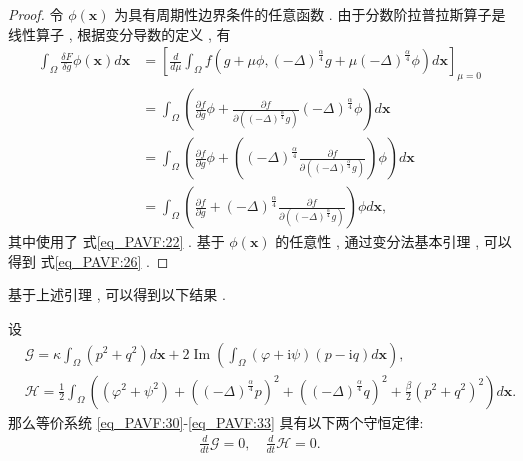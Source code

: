 \begin{proof}
	令 $\phi(\boldsymbol{x})$ 为具有周期性边界条件的任意函数 . 由于分数阶拉普拉斯算子是线性算子 , 根据变分导数的定义 , 有
\begin{equation}
\begin{aligned}
\int_{\Omega} \frac{\delta F}{\delta g} \phi(\boldsymbol{x}) d \boldsymbol{x} &=\left[\frac{d}{d \mu} \int_{\Omega} f\left(g+\mu \phi , (-\Delta)^{\frac{\alpha}{4}} g+\mu(-\Delta)^{\frac{\alpha}{4}} \phi\right) d \boldsymbol{x}\right]_{\mu=0} \\
&=\int_{\Omega}\left(\frac{\partial f}{\partial g} \phi+\frac{\partial f}{\partial\left((-\Delta)^{\frac{\alpha}{4}} g\right)}(-\Delta)^{\frac{\alpha}{4}} \phi\right) d \boldsymbol{x}\\
&=\int_{\Omega}\left(\frac{\partial f}{\partial g} \phi+\left((-\Delta)^{\frac{\alpha}{4}} \frac{\partial f}{\partial\left((-\Delta)^{\frac{\alpha}{4}} g\right)}\right) \phi\right) d \boldsymbol{x} \\
&=\int_{\Omega}\left(\frac{\partial f}{\partial g}+(-\Delta)^{\frac{\alpha}{4}} \frac{\partial f}{\partial\left((-\Delta)^{\frac{\alpha}{4}} g\right)}\right) \phi d \boldsymbol{x} , 
\end{aligned}
\label{eq_27}\end{equation}
其中使用了 式\eqref{eq_PAVF:22} . 基于 $\phi(\boldsymbol{x})$ 的任意性 , 通过变分法基本引理 , 可以得到 式\eqref{eq_PAVF:26} . 
\end{proof}

基于上述引理 , 可以得到以下结果 . 

\begin{theorem}	\label{thm_PAVF:2_1}
设
\begin{align}
&\mathcal{G}=\kappa\int_{\Omega}(p^2+q^2) d \boldsymbol{x}+2\operatorname{Im}(\int_{\Omega}(\varphi+\mathrm{i}\psi)(p-\mathrm{i}q)d \boldsymbol{x}) , \label{eq_PAVF:34} \\
&\mathcal{H}=\frac{1}{2}\int_{\Omega}\left((\varphi^2+\psi^2)+\left((-\Delta)^{\frac{\alpha}{4}} p\right)^{2}+\left((-\Delta)^{\frac{\alpha}{4}} q\right)^{2}+\frac{\beta}{2}(p^2+q^2)^{2}\right) d \boldsymbol{x} . \label{eq_PAVF:35}
\end{align}
那么等价系统 \eqref{eq_PAVF:30}-\eqref{eq_PAVF:33} 具有以下两个守恒定律:
\begin{align}
\frac{d}{d t} \mathcal{G}=0 , \quad \frac{d}{d t} \mathcal{H}=0 . 
\end{align}
\end{theorem}


